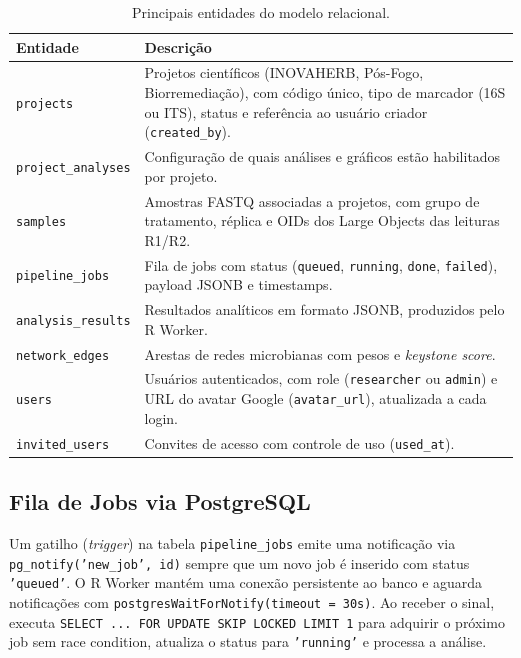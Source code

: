 \begin{table}[H]
\centering
\caption{Principais entidades do modelo relacional.}
\label{qd:tabelas}
\begin{tabularx}{\textwidth}{lX}
\toprule
\textbf{Entidade} & \textbf{Descrição} \\
\midrule
\texttt{projects}         & Projetos científicos (INOVAHERB, Pós-Fogo, Biorremediação), com código único, tipo de marcador (16S ou ITS), status e referência ao usuário criador (\texttt{created\_by}). \\
\texttt{project\_analyses}& Configuração de quais análises e gráficos estão habilitados por projeto. \\
\texttt{samples}          & Amostras FASTQ associadas a projetos, com grupo de tratamento, réplica e OIDs dos Large Objects das leituras R1/R2. \\
\texttt{pipeline\_jobs}   & Fila de jobs com status (\texttt{queued}, \texttt{running}, \texttt{done}, \texttt{failed}), payload JSONB e timestamps. \\
\texttt{analysis\_results}& Resultados analíticos em formato JSONB, produzidos pelo R Worker. \\
\texttt{network\_edges}   & Arestas de redes microbianas com pesos e \textit{keystone score}. \\
\texttt{users}            & Usuários autenticados, com role (\texttt{researcher} ou \texttt{admin}) e URL do avatar Google (\texttt{avatar\_url}), atualizada a cada login. \\
\texttt{invited\_users}   & Convites de acesso com controle de uso (\texttt{used\_at}). \\
\bottomrule
\end{tabularx}
\end{table}

\subsection{Fila de Jobs via PostgreSQL}

Um gatilho (\textit{trigger}) na tabela \texttt{pipeline\_jobs} emite
uma notificação via \texttt{pg\_notify('new\_job', id)} sempre que um
novo job é inserido com status \texttt{'queued'}. O R Worker mantém
uma conexão persistente ao banco e aguarda notificações com
\texttt{postgresWaitForNotify(timeout = 30s)}. Ao receber o sinal,
executa \texttt{SELECT ... FOR UPDATE SKIP LOCKED LIMIT 1} para
adquirir o próximo job sem race condition, atualiza o status para
\texttt{'running'} e processa a análise.

